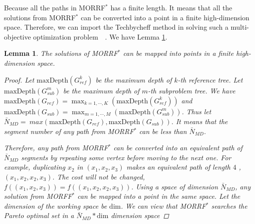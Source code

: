 \documentclass[conference]{IEEEtran}
\newtheorem{lem}{Lemma}
\begin{document}
Because all the paths in MORRF$^{*}$ has a finite length.
It means that all the solutions from MORRF$^{*}$ can be converted into a point in a finite high-dimension space.
Therefore, we can import the Techbycheff method in solving such a multi-objective optimization problem~\cite{4358754}~\cite{miettinen1999nonlinear}.
We have Lemma \ref{lem:moo-d:rrt}.

\begin{lem}
\label{lem:moo-d:rrt}
The solutions of MORRF$^{*}$ can be mapped into points in a finite high-dimension space.
\begin{proof}
Let $ \mbox{maxDepth}(G_{ref}^{k}) $ be the maximum depth of $ k $-th reference tree.
Let $ \mbox{maxDepth}(G_{sub}^{m}) $ be the maximum depth of $ m $-th subproblem tree.
We have $ \mbox{maxDepth}(G_{ref}) = \max_{k = 1 , \cdots , K} ( \mbox{maxDepth}(G_{ref}^{k}) ) $ and $ \mbox{maxDepth}(G_{sub}) = \max_{m = 1 , \cdots , M} ( \mbox{maxDepth}(G_{sub}^{m}) ) $.
Thus let 
 $ \bar{N}_{MD} =\ max \left(  \mbox{maxDepth}(G_{ref}), \mbox{maxDepth}(G_{sub}) \right) $.
It means that the segment number of any path from MORRF$^{*}$ can be less than $ \bar{N}_{MD} $.

Therefore, any path from MORRF$^{*}$ can be converted into an equivalent path of $ \bar{N}_{MD} $ segments by repeating some vertex before moving to the next one.
For example, duplicating $ x_{2} $ in $ (x_{1} , x_{2}, x_{3} ) $ makes an equivalent path of length $ 4 $ , $ (x_{1} , x_{2},  x_{2}, x_{3} ) $.
The cost will not be changed, $ f( (x_{1} , x_{2}, x_{3}) ) = f( (x_{1} , x_{2},  x_{2}, x_{3} ) )$.
Using a space of dimension $ \bar{N}_{MD} $, any solution from MORFF$^{*}$ can be mapped into a point in the same space.
Let the dimension of the working space be $ \mbox{dim} $.
We can view that MORRF$^{*}$ searches the Pareto optimal set in a $ \bar{N}_{MD} * \mbox{dim} $ dimension space
\end{proof}
\end{lem}
\end{document}
